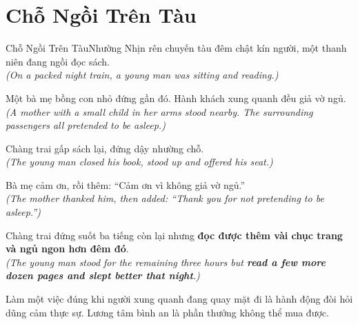 \section{Chỗ Ngồi Trên Tàu}
\begin{truyen}{Chỗ Ngồi Trên Tàu}{Nhường Nhịn}
rên chuyến tàu đêm chật kín người, một thanh niên đang ngồi đọc sách.\\
\textit{(On a packed night train, a young man was sitting and reading.)}

Một bà mẹ bồng con nhỏ đứng gần đó. Hành khách xung quanh đều giả vờ ngủ.\\
\textit{(A mother with a small child in her arms stood nearby. The surrounding passengers all pretended to be asleep.)}

Chàng trai gấp sách lại, đứng dậy nhường chỗ.\\
\textit{(The young man closed his book, stood up and offered his seat.)}

Bà mẹ cảm ơn, rồi thêm: ``Cảm ơn vì không giả vờ ngủ.''\\
\textit{(The mother thanked him, then added: ``Thank you for not pretending to be asleep.'')}

Chàng trai đứng suốt ba tiếng còn lại nhưng \textbf{đọc được thêm vài chục trang và ngủ ngon hơn đêm đó}.\\
\textit{(The young man stood for the remaining three hours but \textbf{read a few more dozen pages and slept better that night}.)}
\end{truyen}
\begin{baihoc}
  Làm một việc đúng khi người xung quanh đang quay mặt đi là hành động đòi hỏi dũng cảm thực sự. Lương tâm bình an là phần thưởng không thể mua được.
\end{baihoc}


